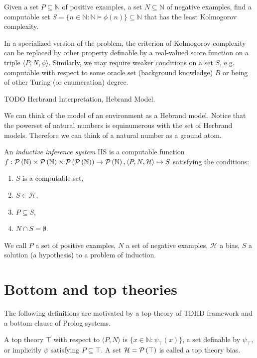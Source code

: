 Given a set $P \subseteq \mathbb{N}$ of positive examples,
a set $N \subseteq \mathbb{N}$ of negative examples,
find a computable set $S = \{n \in \mathbb{N} : \mathbb{N} \models \phi(n) \} \subseteq \mathbb{N}$ that has the least Kolmogorov complexity.

In a specialized version of the problem, the criterion of Kolmogorov complexity can be replaced by other property definable by a real-valued score function on a triple $\langle P, N, \phi \rangle$. Similarly, we may require weaker conditions on a set $S$, e.g. computable with respect to some oracle set (background knowledge) $B$ or being of other Turing (or enumeration) degree.

\begin{defn}
TODO Herbrand Interpretation, Hebrand Model.
\end{defn}

We can think of the model of an environment as a Hebrand model. Notice that the powerset of natural numbers is equinumerous with the set of Herbrand models. Therefore we can think of a natural number as a ground atom.

\begin{defn}
An \emph{inductive inference system} IIS is a computable function
$f: \mathcal{P} \left({ \mathbb{N} }\right) \times \mathcal{P} \left({ \mathbb{N} }\right) \times \mathcal{P} \left({ \mathcal{P} \left({ \mathbb{N} }\right) }\right)
\to \mathcal{P} \left({ \mathbb{N} }\right),
\langle P, N, \mathcal{H} \rangle \mapsto S$
satisfying the conditions:

\begin{enumerate}
\item $S$ is a computable set,
\item $S \in \mathcal{H}$,
\item $P \subseteq S$,
\item $N \cap S = \emptyset$.
\end{enumerate}
\end{defn}

We call $P$ a set of positive examples, $N$ a set of negative examples, $\mathcal{H}$ a bias, $S$ a solution (a hypothesis) to a problem of induction.

\section{Bottom and top theories}
The following definitions are motivated by a top theory of TDHD framework and a bottom clause of Prolog systems.
\begin{defn}
A top theory $\top$ with respect to $\langle P, N \rangle$ is
$\{x \in \mathbb{N} : \psi_\top(x)\}$,
a set definable by $\psi_\top$, or implicitly $\psi$ satisfying
$P \subseteq \top$.
A set $\mathcal{H}=\mathcal{P} \left({ \top }\right)$ is called a top theory bias.
\end{defn}

